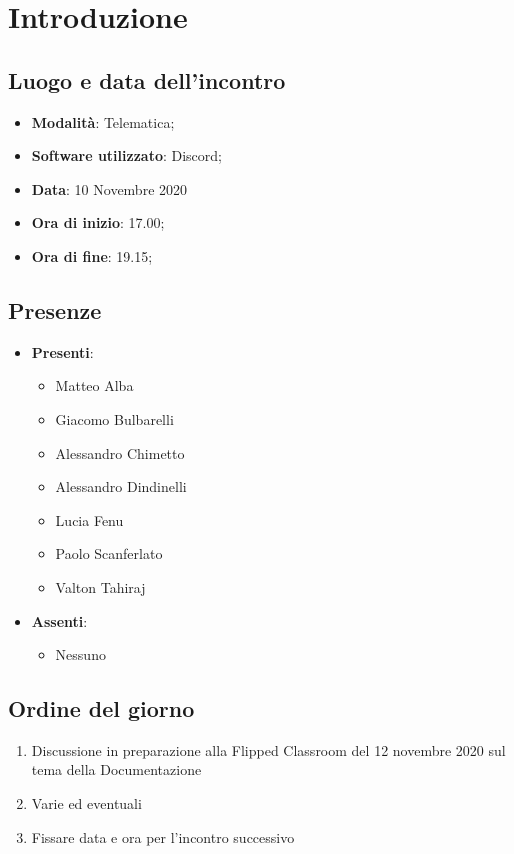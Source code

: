 \documentclass[]{article}
\begin{document}
	
	
	
	\newpage
	
	\section{Introduzione}
\subsection{Luogo e data dell'incontro}
\begin{itemize}
	\item \textbf{Modalità}: Telematica;
	\item \textbf{Software utilizzato}: Discord;
	\item \textbf{Data}: 10 Novembre 2020
	\item \textbf{Ora di inizio}: 17.00;
	\item \textbf{Ora di fine}: 19.15;
\end{itemize}

\subsection{Presenze}
\begin{itemize}
	\item \textbf{Presenti}: 
	\begin{itemize}
		\item Matteo Alba
		\item Giacomo Bulbarelli		
		\item Alessandro Chimetto
		\item Alessandro Dindinelli
		\item Lucia Fenu
		\item Paolo Scanferlato
		\item Valton Tahiraj
	\end{itemize}
	\item \textbf{Assenti}:
	\begin{itemize}
		\item Nessuno
	\end{itemize}
\end{itemize}

\subsection{Ordine del giorno}
\begin{enumerate}
	\item Discussione in preparazione alla Flipped Classroom del 12 novembre 2020 sul tema della Documentazione
	\item Varie ed eventuali
	\item Fissare data e ora per l'incontro successivo
\end{enumerate}
\end{document}
